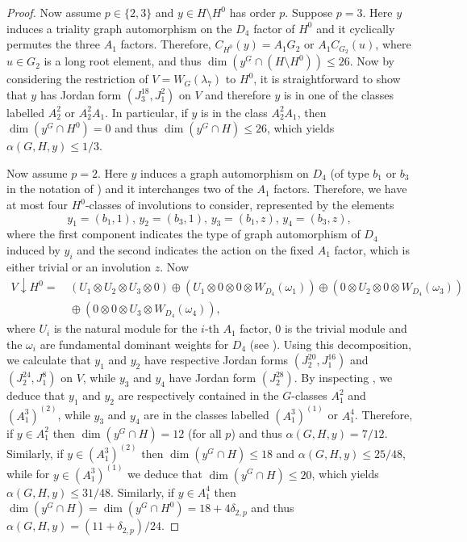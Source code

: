\documentclass[twoside,a4paper,reqno,11pt]{amsart}
\renewcommand{\a}{\alpha}
\renewcommand{\l}{\lambda}
\newcommand{\<}{\langle}
\renewcommand{\>}{\rangle}
\newcommand{\leqs}{\leqslant}
\renewcommand{\:}{\colon}
\theoremstyle{plain}
\theoremstyle{definition}
\begin{document}
\begin{proof}
Now assume $p \in \{2,3\}$ and $y \in H \setminus H^0$ has order $p$. Suppose $p=3$. Here $y$ induces a triality graph automorphism on the $D_4$ factor of $H^0$ and it cyclically permutes the three $A_1$ factors. Therefore, $C_{H^0}(y) = A_1G_2$ or $A_1C_{G_2}(u)$, where $u \in G_2$ is a long root element, and thus $\dim(y^G \cap (H \setminus H^0)) \leqs 26$. Now by considering the restriction of $V = W_G(\l_7)$ to $H^0$, it is straightforward to show that $y$ has Jordan form $(J_3^{18},J_1^2)$ on $V$ and therefore $y$ is in one of the classes labelled $A_2^2$ or $A_2^2A_1$. In particular, if  $y$ is in the class $A_2^2A_1$, then $\dim(y^G \cap H^0) = 0$ and thus $\dim(y^G \cap H) \leqs 26$, which yields $\a(G,H,y) \leqs 1/3$. 

Now assume $p=2$. Here $y$ induces a graph automorphism on $D_4$ (of type $b_1$ or $b_3$ in the notation of \cite{AS}) and it interchanges two of the $A_1$ factors. Therefore, we have at most four $H^0$-classes of involutions to consider, represented by the elements
\[
y_1 = (b_1,1), \, y_2 = (b_3,1), \, y_3 = (b_1,z), \, y_4 = (b_3,z),
\]
where the first component indicates the type of graph automorphism of $D_4$ induced by $y_i$ and the second indicates the action on the fixed $A_1$ factor, which is either trivial or an involution $z$. Now 
\begin{align*}
V \downarrow H^0 =  & \, (U_1 \otimes U_2 \otimes U_3 \otimes 0) \oplus (U_1 \otimes 0 \otimes 0 \otimes W_{D_4}(\omega_1)) \oplus (0 \otimes U_2 \otimes 0 \otimes W_{D_4}(\omega_3)) \\
& \, \oplus (0 \otimes 0 \otimes U_3 \otimes W_{D_4}(\omega_4)), 
\end{align*}
where $U_i$ is the natural module for the $i$-th $A_1$ factor, $0$ is the trivial module and the $\omega_i$ are fundamental dominant weights for $D_4$ (see \cite[Table 4]{Thomas}). Using this decomposition, we calculate that $y_1$ and $y_2$ have respective Jordan forms $(J_2^{20},J_1^{16})$ and $(J_2^{24},J_1^8)$ on $V$, while $y_3$ and $y_4$ have Jordan form $(J_2^{28})$. By inspecting \cite[Table 7]{Law1}, we deduce that  $y_1$ and $y_2$ are respectively contained in the $G$-classes $A_1^2$ and $(A_1^3)^{(2)}$, while $y_3$ and $y_4$ are in the classes labelled $(A_1^3)^{(1)}$ or $A_1^4$. Therefore, if $y \in A_1^2$ then $\dim(y^G \cap H) = 12$ (for all $p$) and thus $\a(G,H,y) =  7/12$. Similarly, if $y \in (A_1^3)^{(2)}$ then $\dim(y^G \cap H) \leqs 18$  and $\a(G,H,y) \leqs 25/48$, while for $y \in (A_1^3)^{(1)}$ we deduce that $\dim (y^G \cap H) \leqs 20$, which yields $\a(G,H,y) \leqs 31/48$. Similarly, if $y \in A_1^4$ then $\dim(y^G \cap H) = \dim(y^G \cap H^0) = 18+4\delta_{2,p}$ and thus $\a(G,H,y) = (11+\delta_{2,p})/24$. 


\end{proof}
\end{document}

